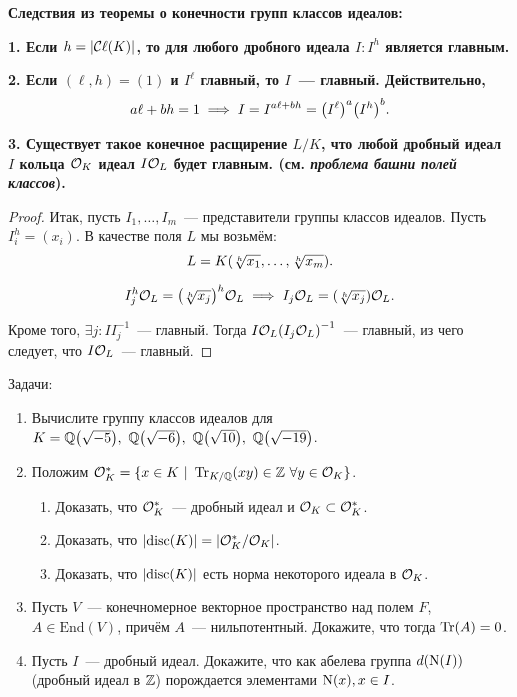	\noindent\bf{Следствия из теоремы о конечности групп классов идеалов:}

	\bf{1.} Если $h = \left\lvert \operatorname{\mathcal{C}\mathbf{\ell}}(K) \right\rvert$,  то для любого дробного идеала $I\colon I^{h}$ является главным.

	\bf{2.} Если $(\ell, h) = (1)$ и $I^{\ell}$ главный, то $I$~--- главный. Действительно, 
	\[
		a\ell + bh = 1 \implies I = I^{a\ell + bh} = \lr*{I^{\ell}}^{a} \lr*{I^{h}}^{b}.
	\]

	\bf{3.} Существует такое конечное расщирение $L/K$, что любой дробный идеал $I$ кольца $\mathcal{O}_{K}$ идеал $I\mathcal{O}_{L}$ будет главным. (см. \emph{проблема башни полей классов}).
	\begin{proof}
		Итак, пусть $I_1, \ldots, I_{m}$~--- представители группы классов идеалов. Пусть $I_i^{h} = (x_i)$. В качестве поля $L$ мы возьмём: 
		\[
			L = K\lr*{\sqrt[h]{x_1}, \ldots, \sqrt[h]{x_m}}.
		\]

		\[
			I_{j}^h \cO_{L} = \lr*{\sqrt[h]{x_j}}^{h}\cO_{L} \implies I_j\cO_{L} = (\sqrt[h]{x_j})\cO_{L}. 
		\]

		Кроме того, $\exists j\colon I I_{j}^{-1}$~--- главный. Тогда $I \cO_{L} \lr*{I_{j}\cO_{L}}^{-1}$~--- главный, из чего следует, что $I \mathcal{O}_{L}$~--- главный. 
	\end{proof}

	\begin{homework}\label{hw_6}
		Задачи: 
		\begin{enumerate}
			\item Вычислите группу классов идеалов для $K = \Q\lr*{\sqrt{-5}}, \ \Q\lr*{\sqrt{-6}}, \ \Q\lr*{\sqrt{10}}, \ \Q\lr*{\sqrt{-19}}$.

			\item Положим $\cO_{K}^{*} = \{ x \in K \ \vert \ \Tr_{K/\Q}(xy) \in \Z \ \forall y \in \cO_{K} \}$.
				\begin{enumerate}
					\item Доказать, что $\mathcal{O}_{K}^{*}$~--- дробный идеал и $\mathcal{O}_{K} \subset \mathcal{O}_{K}^{*}$.

					\item Доказать, что $\left\lvert \operatorname{disc}(K) \right\rvert = \left\lvert \mathcal{O}_{K}^*/\mathcal{O}_{K} \right\rvert$.

					\item Доказать, что $\left\lvert \operatorname{disc}(K) \right\rvert$ есть норма некоторого идеала в $\mathcal{O}_{K}$.
				\end{enumerate}
			\item Пусть $V$~--- конечномерное векторное пространство над полем $F$, $A \in \mathrm{End}(V)$, причём $A$~--- нильпотентный. Докажите, что тогда $\operatorname{Tr}(A) = 0$.

			\item Пусть $I$~--- дробный идеал. Докажите, что как абелева группа $d\lr*{\Nm(I)}$ (дробный идеал в $\mathbb{Z}$) порождается элементами $\operatorname{\mathrm{N}}(x), x \in I$.
		\end{enumerate}

	\end{homework}




	
